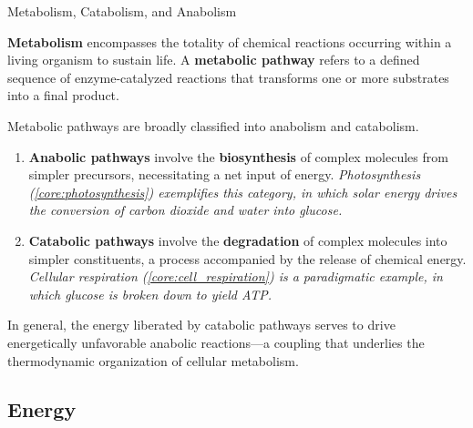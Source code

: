 \documentclass[10pt]{article}
\begin{document}
    \begin{core}{Metabolism, Catabolism, and Anabolism}

      \textbf{Metabolism} encompasses the totality of chemical reactions occurring within a living organism to sustain life. A \textbf{metabolic pathway} refers to a defined sequence of enzyme-catalyzed reactions that transforms one or more substrates into a final product.


      Metabolic pathways are broadly classified into anabolism and catabolism.

      \begin{enumerate}

        \item \textbf{Anabolic pathways} involve the \textbf{biosynthesis} of complex molecules from simpler precursors, necessitating a net input of energy. \textit{Photosynthesis (\autoref{core:photosynthesis}) exemplifies this category, in which solar energy drives the conversion of carbon dioxide and water into glucose.}


        \item \textbf{Catabolic pathways} involve the \textbf{degradation} of complex molecules into simpler constituents, a process accompanied by the release of chemical energy. \textit{Cellular respiration (\autoref{core:cell_respiration}) is a paradigmatic example, in which glucose is broken down to yield ATP.}


      \end{enumerate}

      In general, the energy liberated by catabolic pathways serves to drive energetically unfavorable anabolic reactions---a coupling that underlies the thermodynamic organization of cellular metabolism.

    \end{core}  
    
  \subsection{Energy}
\end{document}
